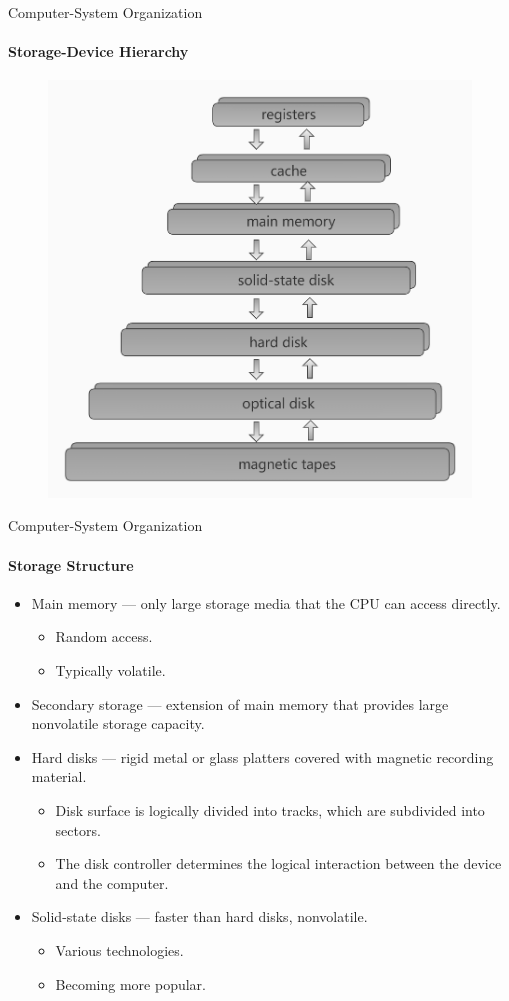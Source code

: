 \documentclass[10pt]{beamer}
\begin{document}
\begin{frame}{Computer-System Organization}
\framesubtitle{Storage-Device Hierarchy}
\begin{figure}
\includegraphics[width=.7\linewidth]{resources/1-18storage_device_hierarchy.jpg} 
\end{figure}
\end{frame}

\begin{frame}{Computer-System Organization}
\framesubtitle{Storage Structure}
\begin{itemize}
\item Main memory --- only large storage media that the CPU can access directly.
\begin{itemize}
\item \alert{Random access}.
\item Typically \alert{volatile}.
\end{itemize}
\item Secondary storage --- extension of main memory that provides large \alert{nonvolatile} storage capacity.
\item Hard disks --- rigid metal or glass platters covered with magnetic recording material.
\begin{itemize}
\item Disk surface is logically divided into tracks, which are subdivided into sectors.
\item The disk controller determines the logical interaction between the device and the computer.
\end{itemize}
\item Solid-state disks --- faster than hard disks, nonvolatile.
\begin{itemize}
\item Various technologies.
\item Becoming more popular.
\end{itemize}
\end{itemize}
\end{frame}
\end{document}
